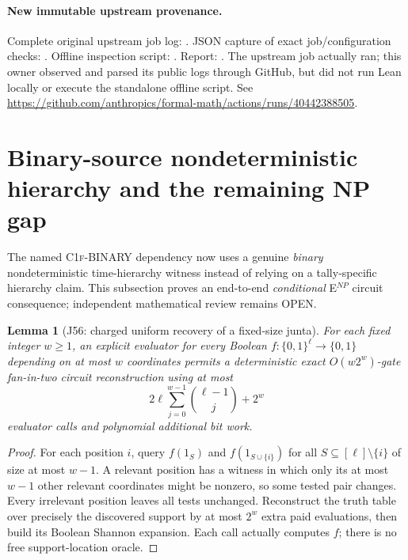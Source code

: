 \documentclass[11pt]{article}
\newtheorem{lemma}{Lemma}
\begin{document}
\paragraph{New immutable upstream provenance.}
Complete original upstream job log:
.
JSON capture of exact job/configuration checks:
.
Offline inspection script:
.
Report: .
The upstream job actually ran; this owner observed and parsed its
public logs through GitHub, but did not run Lean locally or execute
the standalone offline script. See
\url{https://github.com/anthropics/formal-math/actions/runs/40442388505}.

\section{Binary-source nondeterministic hierarchy and the remaining NP gap}
The named \textsc{C1f-BINARY} dependency now uses a genuine \emph{binary}
nondeterministic time-hierarchy witness instead of relying on a tally-specific
hierarchy claim. This subsection proves an end-to-end \emph{conditional}
E$^{NP}$ circuit consequence; independent mathematical review remains OPEN.

\begin{lemma}[J56: charged uniform recovery of a fixed-size junta]
For each fixed integer $w\ge1$, an explicit evaluator for every Boolean
$f:\{0,1\}^{\ell}\to\{0,1\}$ depending on at most $w$ coordinates permits a
deterministic exact $O(w2^w)$-gate fan-in-two circuit reconstruction using at most
\[
 2\ell\sum_{j=0}^{w-1}\binom{\ell-1}{j}+2^w
\]
evaluator calls and polynomial additional bit work.
\end{lemma}
\begin{proof}
For each position $i$, query $f(1_S)$ and $f(1_{S\cup\{i\}})$ for all
$S\subseteq[\ell]\setminus\{i\}$ of size at most $w-1$. A relevant position
has a witness in which only its at most $w-1$ other relevant coordinates
might be nonzero, so some tested pair changes. Every irrelevant position
leaves all tests unchanged. Reconstruct the truth table over precisely the
discovered support by at most $2^w$ extra paid evaluations, then build its
Boolean Shannon expansion. Each call actually computes $f$; there is no
free support-location oracle.
\end{proof}
\end{document}
